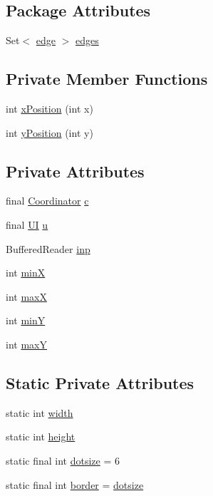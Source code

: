 \subsection*{Package Attributes}
\begin{DoxyCompactItemize}
\item 
Set$<$ \hyperlink{classSurface_1_1edge}{edge} $>$ \hyperlink{classSurface_a14b4d5e0d634c3d8ddbcedce30a5ac29}{edges}
\end{DoxyCompactItemize}
\subsection*{Private Member Functions}
\begin{DoxyCompactItemize}
\item 
int \hyperlink{classSurface_ac1c9537b447ac8e2bc0bccdef09dc748}{x\-Position} (int x)
\item 
int \hyperlink{classSurface_a1ef57990c20521aa95c0e75067c4c0c0}{y\-Position} (int y)
\end{DoxyCompactItemize}
\subsection*{Private Attributes}
\begin{DoxyCompactItemize}
\item 
final \hyperlink{classCoordinator}{Coordinator} \hyperlink{classSurface_a3d62a7cdb6e1828d358841fc635100e8}{c}
\item 
final \hyperlink{classUI}{U\-I} \hyperlink{classSurface_a59bf754a4bdcadeebe487d67ad6862cb}{u}
\item 
Buffered\-Reader \hyperlink{classSurface_a69cbcb8bd0149f5bdad90eb7a490c02d}{inp}
\item 
int \hyperlink{classSurface_adc95f7323a8ae6abca20ada97bcf992b}{min\-X}
\item 
int \hyperlink{classSurface_a48444332ae91b09d9629f71ce6a3b323}{max\-X}
\item 
int \hyperlink{classSurface_ac1367f57883962977a2459af53ca8821}{min\-Y}
\item 
int \hyperlink{classSurface_a9201381dc1016d9671a39d2e9f332b38}{max\-Y}
\end{DoxyCompactItemize}
\subsection*{Static Private Attributes}
\begin{DoxyCompactItemize}
\item 
static int \hyperlink{classSurface_a484eb0caa3698d2aa98b8a4113f408e5}{width}
\item 
static int \hyperlink{classSurface_ac7967deb54e276c07a00504f5259f325}{height}
\item 
static final int \hyperlink{classSurface_ab1db9b83208286d2e4e1b90d4b360a6c}{dotsize} = 6
\item 
static final int \hyperlink{classSurface_a35cca0a13938241e64e777cbaedc009d}{border} = \hyperlink{classSurface_ab1db9b83208286d2e4e1b90d4b360a6c}{dotsize}
\end{DoxyCompactItemize}


